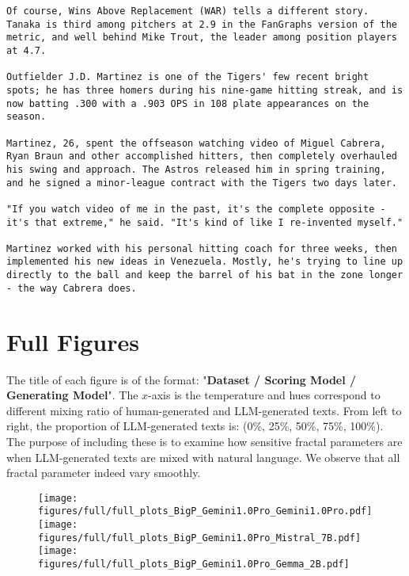 \begin{lstlisting}
Of course, Wins Above Replacement (WAR) tells a different story. Tanaka is third among pitchers at 2.9 in the FanGraphs version of the metric, and well behind Mike Trout, the leader among position players at 4.7.

Outfielder J.D. Martinez is one of the Tigers' few recent bright spots; he has three homers during his nine-game hitting streak, and is now batting .300 with a .903 OPS in 108 plate appearances on the season.

Martinez, 26, spent the offseason watching video of Miguel Cabrera, Ryan Braun and other accomplished hitters, then completely overhauled his swing and approach. The Astros released him in spring training, and he signed a minor-league contract with the Tigers two days later.

"If you watch video of me in the past, it's the complete opposite - it's that extreme," he said. "It's kind of like I re-invented myself."

Martinez worked with his personal hitting coach for three weeks, then implemented his new ideas in Venezuela. Mostly, he's trying to line up directly to the ball and keep the barrel of his bat in the zone longer - the way Cabrera does.
\end{lstlisting}

\newpage
\section{Full Figures}\label{sect:app:full_figures}
The title of each figure is of the format: "\textbf{Dataset / Scoring Model / Generating Model}". The $x$-axis is the temperature and hues correspond to different mixing ratio of human-generated and LLM-generated texts. From left to right, the proportion of LLM-generated texts is: (0\%, 25\%, 50\%, 75\%, 100\%). The purpose of including these is to examine how sensitive fractal parameters are when LLM-generated texts are mixed with natural language. We observe that all fractal parameter indeed vary smoothly. 

\begin{figure}[H]
    \centering
    \texttt{[image: figures/full/full\_plots\_BigP\_Gemini1.0Pro\_Gemini1.0Pro.pdf]}
    \texttt{[image: figures/full/full\_plots\_BigP\_Gemini1.0Pro\_Mistral\_7B.pdf]}
    \texttt{[image: figures/full/full\_plots\_BigP\_Gemini1.0Pro\_Gemma\_2B.pdf]}
    \label{fig:full_gemini_bigp}
\end{figure}

